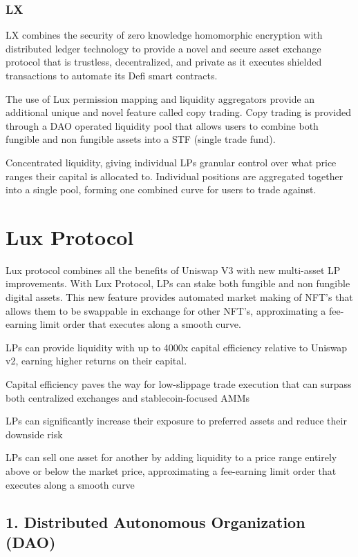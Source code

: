\documentclass[11pt]{article}
\begin{document}
\subsubsection{LX}

LX combines the security of zero knowledge homomorphic encryption with distributed ledger technology to provide a novel and secure asset exchange protocol that is trustless, decentralized, and private as it executes shielded transactions to automate its Defi smart contracts.


The use of Lux permission mapping and liquidity aggregators provide an additional unique and novel feature called copy trading. Copy trading is provided through a DAO operated liquidity pool that allows users to combine both fungible and non fungible assets into a STF (single trade fund).


Concentrated liquidity, giving individual LPs granular control over what price ranges their capital is allocated to. Individual positions are aggregated together into a single pool, forming one combined curve for users to trade against.


\section{Lux Protocol}

Lux protocol combines all the benefits of Uniswap V3 with new multi-asset LP improvements. With Lux Protocol, LPs can stake both fungible and non fungible digital assets. This new feature provides automated market making of NFT's that allows them to be  swappable in exchange for other NFT's, approximating a fee-earning limit order that executes along a smooth curve.


LPs can provide liquidity with up to 4000x capital efficiency relative to Uniswap v2, earning higher returns on their capital.


Capital efficiency paves the way for low-slippage trade execution that can surpass both centralized exchanges and stablecoin-focused AMMs


LPs can significantly increase their exposure to preferred assets and reduce their downside risk


LPs can sell one asset for another by adding liquidity to a price range entirely above or below the market price, approximating a fee-earning limit order that executes along a smooth curve


\subsection{1. Distributed Autonomous Organization (DAO)}
\end{document}
